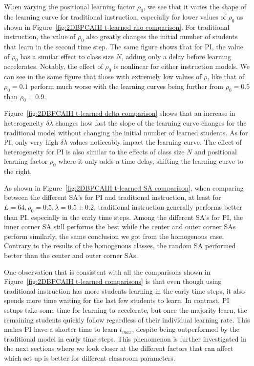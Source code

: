 When varying the positional learning factor $\rho_0$, we see that it varies the shape of the learning curve for traditional instruction, especially for lower values of $\rho_0$ as shown in Figure~\ref{fig:2DBPCAIH t-learned rho comparison}. 
For traditional instruction, the value of $\rho_0$ also greatly changes the initial number of students that learn in the second time step.
The same figure shows that for PI, the value of $\rho_0$ has a similar effect to class size $N$, adding only a delay before learning accelerates.
Notably, the effect of $\rho_0$ is nonlinear for either instruction models.
We can see in the same figure that those with extremely low values of $\rho$, like that of $\rho_0=0.1$ perform much worse with the learning curves being further from $\rho_0=0.5$ than $\rho_0=0.9$.

Figure~\ref{fig:2DBPCAIH t-learned delta comparison} shows that an increase in heterogeneity $\delta\lambda$ changes how fast the slope of the learning curve changes for the traditional model without changing the initial number of learned students. 
As for PI, only very high $\delta\lambda$ values noticeably impact the learning curve.
The effect of heterogeneity for PI is also similar to the effects of class size $N$ and positional learning factor $\rho_0$ where it only adds a time delay, shifting the learning curve to the right.

As shown in Figure~\ref{fig:2DBPCAIH t-learned SA comparison}, when comparing between the different SA's for PI and traditional instruction, at least for $L=64, \rho_0=0.5, \lambda=0.5\pm0.2$, traditional instruction generally performs better than PI, especially in the early time steps. 
Among the different SA's for PI, the inner corner SA still performs the best while the center and outer corner SAs perform similarly, the same conclusion we got from the homogenous case.
Contrary to the results of the homogenous classes, the random SA performed better than the center and outer corner SAs.

One observation that is consistent with all the comparisons shown in Figure~\ref{fig:2DBPCAIH t-learned comparisons} is that even though using traditional instruction has more students learning in the early time steps, it also spends more time waiting for the last few students to learn. 
In contrast, PI setups take some time for learning to accelerate, but once the majority learn, the remaining students quickly follow regardless of their individual learning rate.
This makes PI have a shorter time to learn $t_{max}$, despite being outperformed by the traditional model in early time steps.
This phenomenon is further investigated in the next sections where we look closer at the different factors that can affect which set up is better for different classroom parameters.

